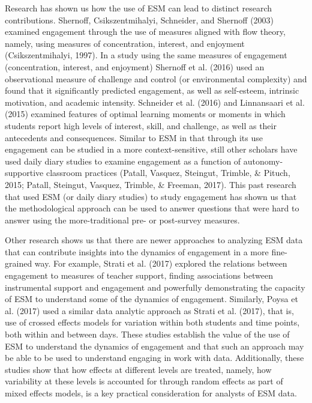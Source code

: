 \documentclass[]{book}
\theoremstyle{definition}
\theoremstyle{definition}
\theoremstyle{definition}
\theoremstyle{remark}
\begin{document}
Research has shown us how the use of ESM can lead to distinct research
contributions. Shernoff, Csikszentmihalyi, Schneider, and Shernoff
(2003) examined engagement through the use of measures aligned with flow
theory, namely, using measures of concentration, interest, and enjoyment
(Csikszentmihalyi, 1997). In a study using the same measures of
engagement (concentration, interest, and enjoyment) Shernoff et al.
(2016) used an observational measure of challenge and control (or
environmental complexity) and found that it significantly predicted
engagement, as well as self-esteem, intrinsic motivation, and academic
intensity. Schneider et al. (2016) and Linnansaari et al. (2015)
examined features of optimal learning moments or moments in which
students report high levels of interest, skill, and challenge, as well
as their antecedents and consequences. Similar to ESM in that through
its use engagement can be studied in a more context-sensitive, still
other scholars have used daily diary studies to examine engagement as a
function of autonomy-supportive classroom practices (Patall, Vasquez,
Steingut, Trimble, \& Pituch, 2015; Patall, Steingut, Vasquez, Trimble,
\& Freeman, 2017). This past research that used ESM (or daily diary
studies) to study engagement has shown us that the methodological
approach can be used to answer questions that were hard to answer using
the more-traditional pre- or post-survey measures.

Other research shows us that there are newer approaches to analyzing ESM
data that can contribute insights into the dynamics of engagement in a
more fine-grained way. For example, Strati et al. (2017) explored the
relations between engagement to measures of teacher support, finding
associations between instrumental support and engagement and powerfully
demonstrating the capacity of ESM to understand some of the dynamics of
engagement. Similarly, Poysa et al. (2017) used a similar data analytic
approach as Strati et al. (2017), that is, use of crossed effects models
for variation within both students and time points, both within and
between days. These studies establish the value of the use of ESM to
understand the dynamics of engagement and that such an approach may be
able to be used to understand engaging in work with data. Additionally,
these studies show that how effects at different levels are treated,
namely, how variability at these levels is accounted for through random
effects as part of mixed effects models, is a key practical
consideration for analysts of ESM data.
\end{document}
